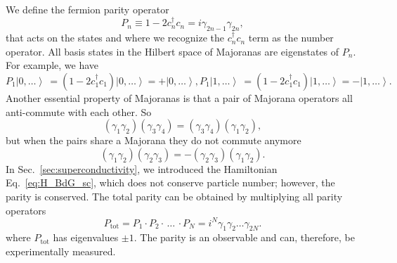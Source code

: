 We define the fermion parity operator
\begin{equation}
P_{n}\equiv1-2c_{n}^{\dagger}c_{n}=i\gamma_{2n-1}\gamma_{2n},
\end{equation}
that acts on the states and where we recognize the $c_{n}^{\dagger}c_{n}$ term as the number operator.
All basis states in the Hilbert space of Majoranas are eigenstates of $P_{n}$.
For example, we have
\begin{subequations}
\begin{equation}
P_{1}\left|0,\dots\right\rangle \ =(1-2c_{1}^{\dagger}c_{1})\left|0,\dots\right\rangle =+\left|0,\dots\right\rangle ,
\end{equation}

\begin{equation}
P_{1}\left|1,\dots\right\rangle \ =(1-2c_{1}^{\dagger}c_{1})\left|1,\dots\right\rangle =-\left|1,\dots\right\rangle .
\end{equation}
\end{subequations}
Another essential property of Majoranas is that a pair of Majorana operators all anti-commute with each other.
So
\begin{equation}
(\gamma_{1}\gamma_{2})(\gamma_{3}\gamma_{4})=(\gamma_{3}\gamma_{4})(\gamma_{1}\gamma_{2}),
\end{equation}
but when the pairs share a Majorana they do not commute anymore
\begin{equation}
(\gamma_{1}\gamma_{2})(\gamma_{2}\gamma_{3})=-(\gamma_{2}\gamma_{3})(\gamma_{1}\gamma_{2}).
\end{equation}
In Sec.~\ref{sec:superconductivity}, we introduced the Hamiltonian Eq.~\eqref{eq:H_BdG_sc}, which does not conserve particle number; however, the parity is conserved.
The total parity can be obtained by multiplying all parity operators
\begin{equation}
P_{\textrm{tot}}=P_{1}\cdot P_{2}\cdot\,\dots\,\cdot P_{N}=i^{N}\gamma_{1}\gamma_{2}\dots\gamma_{2N}.
\end{equation}
where $P_{\textrm{tot}}$ has eigenvalues $\pm1$.
The parity is an observable and can, therefore, be experimentally measured.

